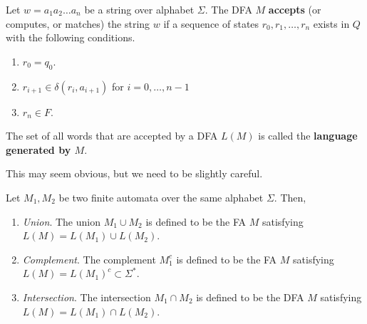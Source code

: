   \begin{definition}
    \label{def:recognized-language-of-an-nfa}
    Let $w = a_1 a_2 \ldots a_n$ be a string over alphabet $\Sigma$. The DFA $M$ \textbf{accepts} (or computes, or matches) the string $w$ if a sequence of states $r_0, r_1, \ldots, r_n$ exists in $Q$ with the following conditions. 
    \begin{enumerate}
      \item $r_0 = q_0$. 
      \item $r_{i+1} \in \delta(r_i, a_{i+1})$ for $i = 0, \ldots, n-1$ 
      \item $r_n \in F$. 
    \end{enumerate}
    The set of all words that are accepted by a DFA $L(M)$ is called the \textbf{language generated by $M$}. 
  \end{definition}

  \begin{algo}
    This may seem obvious, but we need to be slightly careful. 
  \end{algo}

  \begin{definition}
    \label{def:operations-on-finite-automata}
    Let $M_1, M_2$ be two finite automata over the same alphabet $\Sigma$. Then, 
    \begin{enumerate}
      \item \textit{Union}. The union $M_1 \cup M_2$ is defined to be the FA $M$ satisfying $L(M) = L(M_1) \cup L(M_2)$. 
      \item \textit{Complement}. The complement $M_1^c$ is defined to be the FA $M$ satisfying $L(M) = L(M_1)^c \subset \Sigma^\ast$. 
      \item \textit{Intersection}. The intersection $M_1 \cap M_2$ is defined to be the DFA $M$ satisfying $L(M) = L(M_1) \cap L(M_2)$. 
    \end{enumerate}
  \end{definition}

